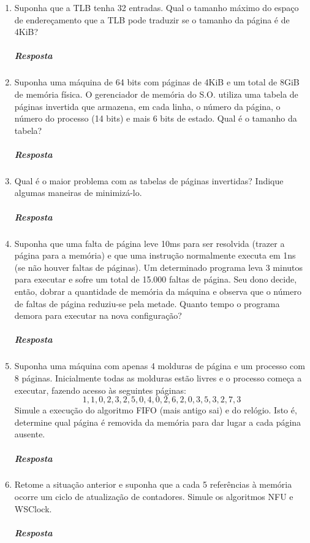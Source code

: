 \documentclass[12pt]{article}
\begin{document}
\begin{enumerate}
\item
Suponha que a TLB tenha 32 entradas. Qual o tamanho máximo do espaço
de endereçamento que a TLB pode traduzir se o tamanho da página é de
4KiB?

\subparagraph{Resposta}
\item
Suponha uma máquina de 64 bits com páginas de 4KiB e um total de 8GiB
de memória física. O gerenciador de memória do S.O. utiliza uma tabela
de páginas invertida que armazena, em cada linha, o número da página,
o número do processo (14 bits) e mais 6 bits de estado. Qual é o tamanho
da tabela?
\subparagraph{Resposta}
\item
Qual é o maior problema com as tabelas de páginas invertidas? Indique
algumas maneiras de minimizá-lo.
\subparagraph{Resposta}
\item
Suponha que uma falta de página leve 10ms para ser resolvida (trazer a
página para a memória) e que uma instrução normalmente executa em 1ns
(se não houver faltas de páginas). Um determinado programa leva 3
minutos para executar e sofre um total de 15.000 faltas de página. Seu
dono decide, então, dobrar a quantidade de memória da máquina e
observa que o número de faltas de página reduziu-se pela
metade. Quanto tempo o programa demora para executar na nova
configuração?
\subparagraph{Resposta}
\item
Suponha uma máquina com apenas 4 molduras de página e um processo com
8 páginas. Inicialmente todas as molduras estão livres e o processo
começa a executar, fazendo acesso às seguintes páginas:
\[ 1, 1, 0, 2, 3, 2, 5, 0, 4, 0, 2, 6, 2, 0, 3, 5, 3, 2, 7, 3 \]
Simule a execução do algoritmo FIFO (mais antigo sai) e do
relógio. Isto é, determine qual página é removida da memória para dar
lugar a cada página ausente.
\subparagraph{Resposta}
\item
Retome a situação anterior e suponha que a cada 5 referências à
memória ocorre um ciclo de atualização de contadores. Simule os
algoritmos NFU e WSClock.
\subparagraph{Resposta}

\end{enumerate}
\end{document}
